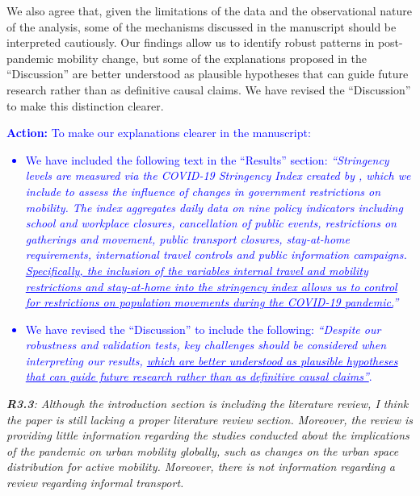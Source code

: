 \documentclass[12pt,a4paper,oneside, reqno]{amsart}
\begin{document}
We also agree that, given the limitations of the data and the observational nature of the analysis, some of the mechanisms discussed in the manuscript should be interpreted cautiously. Our findings allow us to identify robust patterns in post-pandemic mobility change, but some of the explanations proposed in the ``Discussion'' are better understood as plausible hypotheses that can guide future research rather than as definitive causal claims. We have revised the ``Discussion'' to make this distinction clearer.

\textcolor{blue}{\textbf{Action:} To make our explanations clearer in the manuscript:
\begin{itemize}[noitemsep, topsep=0pt]
    \item We have included the following text in the ``Results'' section: \textit{``Stringency levels are measured via the COVID-19 Stringency Index created by \cite{hale2021global}, which we include to assess the influence of changes in government restrictions on mobility. The index aggregates daily data on nine policy indicators including school and workplace closures, cancellation of public events, restrictions on gatherings and movement, public transport closures, stay-at-home requirements, international travel controls and public information campaigns. \uline{Specifically, the inclusion of the variables internal travel and mobility restrictions and stay-at-home into the stringency index allows us to control for restrictions on population movements during the COVID-19 pandemic.}''}
    \item We have revised the ``Discussion'' to include the following: \textit{``Despite our robustness and validation tests, key challenges should be considered when interpreting our results, \uline{which are better understood as plausible hypotheses that can guide future research rather than as definitive causal claims''}}.
\end{itemize}}


\setlength{\leftskip}{0cm} \textit{\textbf{R3.3}: Although the introduction section is including the literature review, I think the paper is still lacking a proper literature review section. Moreover, the review is providing little information regarding the studies conducted about the implications of the pandemic on urban mobility globally, such as changes on the urban space distribution for active mobility. Moreover, there is not information regarding a review regarding informal transport.}
\end{document}

